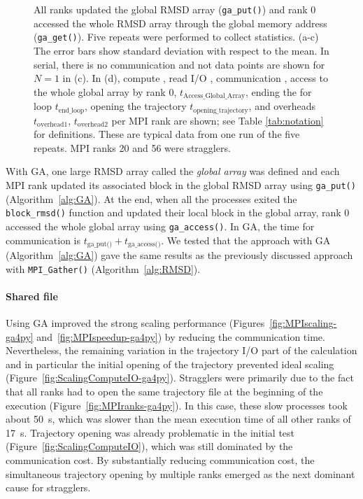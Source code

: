 \begin{figure}[!htb]
{    All ranks updated the global RMSD array (\texttt{ga\_put()}) and rank 0 accessed the whole RMSD array through the global memory address (\texttt{ga\_get()}).
    Five repeats were performed to collect statistics. (a-c) The error bars show standard deviation with respect to the mean. 
    In serial, there is no communication and not data points are shown for $N=1$ in (c).
    In (d), compute \tcomp, read I/O \tIO, communication \tcomm, access to the whole global array by rank 0, $t_{\text{Access\_Global\_Array}}$, ending the for loop $t_{\text{end\_loop}}$,
    opening the trajectory $t_{\text{opening\_trajectory}}$, and overheads $t_{\text{overhead1}}$, $t_{\text{overhead2}}$ per MPI rank are shown; see Table \ref{tab:notation} for definitions. 
    These are typical data from one run of the five repeats.
    MPI ranks 20 and 56 were stragglers.
  }
\label{fig:MPIwithIO-ga4py}
\end{figure}

With GA, one large RMSD array called the \emph{global array} was defined and each MPI rank updated its associated block in the global RMSD array using \texttt{ga\_put()} (Algorithm~\ref{alg:GA}).
At the end, when all the processes exited the \texttt{block\_rmsd()} function and updated their local block in the global array, rank 0  accessed the whole global array using \texttt{ga\_access()}.
In GA, the time for communication is $t_{\text{ga\_put()}}+t_{\text{ga\_access()}}$. 
We tested that the approach with GA (Algorithm~\ref{alg:GA}) gave the same results as the previously discussed approach with \texttt{MPI\_Gather()} (Algorithm~\ref{alg:RMSD}).


\paragraph{Shared file}
Using GA improved the strong scaling performance (Figures~\ref{fig:MPIscaling-ga4py} and~\ref{fig:MPIspeedup-ga4py}) by reducing the communication time.
Nevertheless, the remaining variation in the trajectory I/O part of the calculation and in particular the initial opening of the trajectory prevented ideal scaling (Figure~\ref{fig:ScalingComputeIO-ga4py}).
Stragglers were primarily due to the fact that all ranks had to open the same trajectory file at the beginning of the execution (Figure~\ref{fig:MPIranks-ga4py}).
In this case, these slow processes took about 50~s, which was slower than the mean execution time of all other ranks of 17~s. 
Trajectory opening was already problematic in the initial test (Figure~\ref{fig:ScalingComputeIO}), which was still dominated by the communication cost.
By substantially reducing communication cost, the simultaneous trajectory opening by multiple ranks emerged as the next dominant cause for stragglers.



